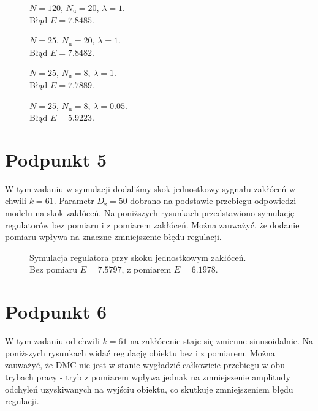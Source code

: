 \begin{figure}[ht]
\centering

\caption{$ N = \num{120} $, $ N_\mathrm{u} = \num{20} $, $ \lambda = \num{1} $.\\Błąd $ E = \num{7,8485} $.}
\label{Z4a}
\end{figure}
\begin{figure}[ht]
\centering

\caption{$ N = \num{25} $, $ N_\mathrm{u} = \num{20} $, $ \lambda = \num{1} $.\\Błąd $ E = \num{7,8482} $.}
\label{Z4b}
\end{figure}
\begin{figure}[ht]
\centering

\caption{$ N = \num{25} $, $ N_\mathrm{u} = \num{8} $, $ \lambda = \num{1} $.\\Błąd $ E = \num{7,7889} $.}
\label{Z4c}
\end{figure}
\begin{figure}[ht]
\centering

\caption{$ N = \num{25} $, $ N_\mathrm{u} = \num{8} $, $ \lambda = \num{0,05} $.\\Błąd $ E = \num{5,9223} $.}
\label{Z4d}
\end{figure}

\chapter{Podpunkt 5}
W tym zadaniu w symulacji dodaliśmy skok jednostkowy sygnału zakłóceń w chwili $ k = 61 $. Parametr $ D_\mathrm{z} = 50 $ dobrano na podstawie przebiegu odpowiedzi modelu na skok zakłóceń. Na poniższych rysunkach przedstawiono symulację regulatorów bez pomiaru i z pomiarem zakłóceń. Można zauważyć, że dodanie pomiaru wpływa na znaczne zmniejszenie błędu regulacji.


\begin{figure}[ht]
\centering

\caption{Symulacja regulatora przy skoku jednostkowym zakłóceń.\\Bez pomiaru $ E = \num{7,5797} $, z pomiarem $ E = \num{6,1978} $.}
\label{Z5a}
\end{figure}


\chapter{Podpunkt 6}
W tym zadaniu od chwili $ k = \num{61} $ na zakłócenie staje się zmienne sinusoidalnie. Na poniższych rysunkach widać regulację obiektu bez i z pomiarem. Można zauważyć, że DMC nie jest w stanie wygładzić całkowicie przebiegu w obu trybach pracy - tryb z pomiarem wpływa jednak na zmniejszenie amplitudy odchyleń uzyskiwanych na wyjściu obiektu, co skutkuje zmniejszeniem błędu regulacji. 

